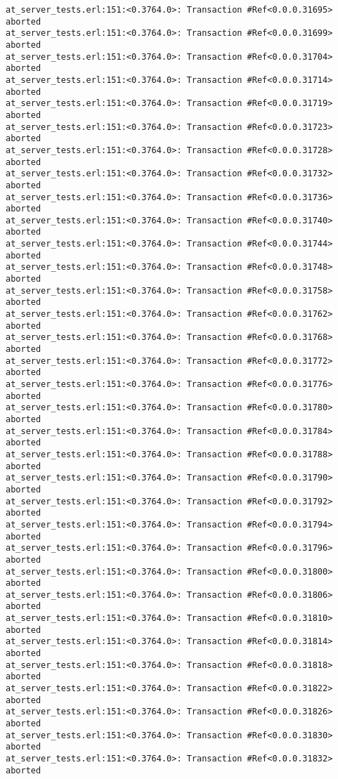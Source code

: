 \documentclass[
paper=a4,
oneside,
fontsize=11pt,
numbers=noenddot,
headinclude=false, %
footinclude=false, %
fleqn,             %
DIV=8
]{scrartcl}
\begin{document}
\begin{lstlisting}[caption=Session output: {\tt
    commit\_t\_competing\_test()} (debug enabled),
  label=lst:testoutextapi, basicstyle=\ttfamily\scriptsize]
at_server_tests.erl:151:<0.3764.0>: Transaction #Ref<0.0.0.31695> aborted
at_server_tests.erl:151:<0.3764.0>: Transaction #Ref<0.0.0.31699> aborted
at_server_tests.erl:151:<0.3764.0>: Transaction #Ref<0.0.0.31704> aborted
at_server_tests.erl:151:<0.3764.0>: Transaction #Ref<0.0.0.31714> aborted
at_server_tests.erl:151:<0.3764.0>: Transaction #Ref<0.0.0.31719> aborted
at_server_tests.erl:151:<0.3764.0>: Transaction #Ref<0.0.0.31723> aborted
at_server_tests.erl:151:<0.3764.0>: Transaction #Ref<0.0.0.31728> aborted
at_server_tests.erl:151:<0.3764.0>: Transaction #Ref<0.0.0.31732> aborted
at_server_tests.erl:151:<0.3764.0>: Transaction #Ref<0.0.0.31736> aborted
at_server_tests.erl:151:<0.3764.0>: Transaction #Ref<0.0.0.31740> aborted
at_server_tests.erl:151:<0.3764.0>: Transaction #Ref<0.0.0.31744> aborted
at_server_tests.erl:151:<0.3764.0>: Transaction #Ref<0.0.0.31748> aborted
at_server_tests.erl:151:<0.3764.0>: Transaction #Ref<0.0.0.31758> aborted
at_server_tests.erl:151:<0.3764.0>: Transaction #Ref<0.0.0.31762> aborted
at_server_tests.erl:151:<0.3764.0>: Transaction #Ref<0.0.0.31768> aborted
at_server_tests.erl:151:<0.3764.0>: Transaction #Ref<0.0.0.31772> aborted
at_server_tests.erl:151:<0.3764.0>: Transaction #Ref<0.0.0.31776> aborted
at_server_tests.erl:151:<0.3764.0>: Transaction #Ref<0.0.0.31780> aborted
at_server_tests.erl:151:<0.3764.0>: Transaction #Ref<0.0.0.31784> aborted
at_server_tests.erl:151:<0.3764.0>: Transaction #Ref<0.0.0.31788> aborted
at_server_tests.erl:151:<0.3764.0>: Transaction #Ref<0.0.0.31790> aborted
at_server_tests.erl:151:<0.3764.0>: Transaction #Ref<0.0.0.31792> aborted
at_server_tests.erl:151:<0.3764.0>: Transaction #Ref<0.0.0.31794> aborted
at_server_tests.erl:151:<0.3764.0>: Transaction #Ref<0.0.0.31796> aborted
at_server_tests.erl:151:<0.3764.0>: Transaction #Ref<0.0.0.31800> aborted
at_server_tests.erl:151:<0.3764.0>: Transaction #Ref<0.0.0.31806> aborted
at_server_tests.erl:151:<0.3764.0>: Transaction #Ref<0.0.0.31810> aborted
at_server_tests.erl:151:<0.3764.0>: Transaction #Ref<0.0.0.31814> aborted
at_server_tests.erl:151:<0.3764.0>: Transaction #Ref<0.0.0.31818> aborted
at_server_tests.erl:151:<0.3764.0>: Transaction #Ref<0.0.0.31822> aborted
at_server_tests.erl:151:<0.3764.0>: Transaction #Ref<0.0.0.31826> aborted
at_server_tests.erl:151:<0.3764.0>: Transaction #Ref<0.0.0.31830> aborted
at_server_tests.erl:151:<0.3764.0>: Transaction #Ref<0.0.0.31832> aborted

\end{lstlisting}
\end{document}
